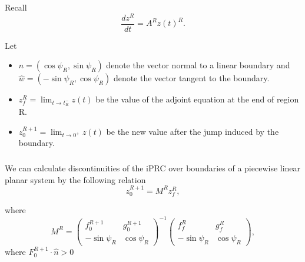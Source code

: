 \documentclass{beamer}
\renewcommand{\matrix}[2]{ \left(\begin{array}{#1} #2 \end{array}\right)}
\begin{document}
% 
% 
% 
% 
  
  \begin{frame}
  \frametitle{\insertsection}
   \framesubtitle{\insertsubsection}
   Recall
   \begin{equation}
    \frac{dz^R}{dt} = A^R z(t)^R.
   \end{equation}

    Let
    \begin{itemize}
     \item $\hat{n} = (\cos\psi_R, \sin\psi_R)$ denote the vector normal to a linear boundary and $\hat{w} = (-\sin\psi_R, \cos\psi_R)$ denote the vector tangent to the boundary.
     \item $z_f^R=\lim_{t\to t_R^-}z(t)$ be the value of the adjoint equation at the end of region R.
     \item $z_0^{R+1}=\lim_{t\to 0^+}z(t)$ be the new value after the jump induced by the boundary. 
    \end{itemize}
  \end{frame}

  \begin{frame}
   \frametitle{\insertsection}
   \framesubtitle{\insertsubsection}
\begin{theorem}
 We can calculate discontinuities of the iPRC over boundaries of a piecewise linear planar system by the following relation
 \begin{equation}
z_0^{R+1}=M^R z_f^R,
\end{equation}

where
\begin{equation}
M^R = \matrix{cc}{f_0^{R+1} & g_0^{R+1}\\
-\sin\psi_R & \cos\psi_R}^{-1}\matrix{cc}{f_f^R & g_f^R\\
-\sin\psi_R & \cos\psi_R},
\end{equation}
where $F_0^{R+1}\cdot \hat{n} > 0$
\end{theorem}
\end{frame}
\end{document}
